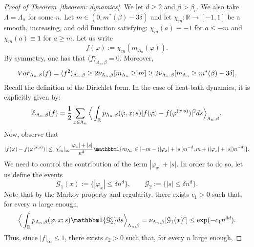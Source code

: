 \documentclass[11pt,a4paper]{article}
\theoremstyle{definition}
\numberwithin{equation}{section}
\begin{document}
\begin{proof}[Proof of Theorem~\textup{\ref{theorem: dynamics}}]

We let $d\geq 2$ and $\beta>\beta_c$. We also take $\Lambda=\Lambda_n$ for some $n$. Let $m \in (0,m^*(\beta)-3\delta)$ and let $\chi_m:\mathbb R \rightarrow [-1,1]$ be a smooth, increasing, and odd function satisfying: $\chi_m(a) \equiv -1$ for $a \leq -m$ and $\chi_m(a) \equiv 1$ for $a \geq m$. Let us write
\begin{equation}
    f(\varphi) := \chi_m(m_{\Lambda_n}(\varphi)).
\end{equation}
By symmetry, one has that $\langle f \rangle_{\Lambda_n,\beta} = 0$. Moreover,
\begin{equation}\label{eq: upper bound sg 0}
    {\rm Var}_{\Lambda_n,\beta}(f)=\langle f^2\rangle_{\Lambda_n,\beta}\geq 2\nu_{\Lambda_n,\beta}[m_{\Lambda_n}\geq m]\geq 2\nu_{\Lambda_n,\beta}[m_{\Lambda_n}\geq m^*(\beta)-3\delta].
\end{equation}
Recall the definition of the Dirichlet form. In the case of heat-bath dynamics, it is explicitly given by:
\begin{equation}\label{eq: upper bound sg 1}
    \mathcal E_{\Lambda_n,\beta}(f) = \frac 12 \sum_{x \in \Lambda_n} \Big\langle \int_{\mathbb R} p_{\Lambda_n,\beta}(\varphi,x;s) |f(\varphi)-f(\varphi^{(x,s)})|^2 {\rm d}s \Big\rangle_{\Lambda_n,\beta}.
\end{equation}
Now, observe that
\begin{equation}\label{eq: upper bound sg 1.5}
|f(\varphi)-f(\varphi^{(x,s)})| \leq |\chi_m'|_\infty \frac{|\varphi_x| + |s|}{n^d} \mathbbm 1 \{ m_{\Lambda_n} \in [-m-(|\varphi_x|+|s|)n^{-d},m+(|\varphi_x|+|s|)n^{-d}] \}.
\end{equation}
We need to control the contribution of the term $|\varphi_x|+|s|$. In order to do so, let us define the events
\begin{equation}
    \mathcal G_1(x):= \{ |\varphi_x|\leq \delta n^d \}, \qquad \mathcal G_2:= \{ |s|\leq \delta n^d \}.  
\end{equation}
Note that by the Markov property and regularity, there exists $c_1>0$ such that, for every $n$ large enough,
\begin{equation}\label{eq: upper bound sg 2}
\Big\langle\int_{\mathbb R} p_{\Lambda_n,\beta}(\varphi,x;s) \mathbbm 1\{ \mathcal{G}_2^c \} {\rm d}s \Big\rangle_{\Lambda_n,\beta } = \nu_{\Lambda_n,\beta}[\mathcal{G}_1(x)^c] \leq \exp(-c_1 n^{4d}). 
\end{equation}
Thus, since $|f|_\infty \leq 1$, there exists $c_2>0$ such that, for every $n$ large enough,

\end{proof}
\end{document}
